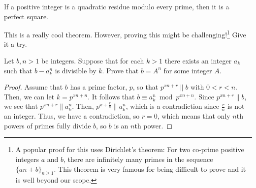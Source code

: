 \documentclass[main.tex]{subfile}
\begin{document}
		\begin{theorem}
			If a positive integer is a quadratic residue modulo every prime, then it is a perfect square.
		\end{theorem}
	This is a really cool theorem. However, proving this might be challenging!\footnote{A popular proof for this uses Dirichlet's theorem: For two co-prime positive integers $a$ and $b$, there are infinitely many primes in the sequence $\{an+b\}_{n\geq1}$. This theorem is very famous for being difficult to prove and it is well beyond our scope.} Give it a try.
		\begin{theorem}
			Let $b,n > 1$ be integers. Suppose that for each $k > 1$ there exists an integer $a_k$ such that $b - a^n_k$ is divisible by $k$. Prove that $b = A^n$ for some integer $A$.
		\end{theorem}

		\begin{proof}
			Assume that $ b$ has a prime factor, $ p$, so that $ p^{xn + r}\|b$ with $ 0 < r < n$. Then, we can let $ k = p^{xn + n}$. It follows that $ b\equiv a_k^n\bmod p^{xn + n}$. Since $ p^{xn + r}\|b$, we see that $ p^{xn + r}\|a_k^n$. Then, $ p^{x + \frac {r}{n}}\|a_k^n$, which is a contradiction since $ \frac {r}{n}$ is not an integer. Thus, we have a contradiction, so $ r = 0$, which means that only $ n$th powers of primes fully divide $ b$, so $ b$ is an $ n$th power.
		\end{proof}
\end{document}
